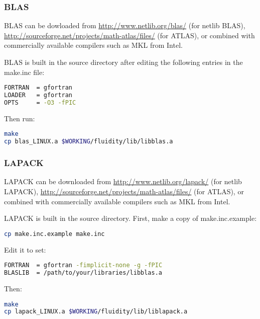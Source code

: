 \subsubsection{BLAS}
\label{sec:required_libraries_numerical_blas}

BLAS can be dowloaded from \url{http://www.netlib.org/blas/} (for netlib BLAS),
\url{http://sourceforge.net/projects/math-atlas/files/} (for ATLAS), or
combined with commercially available compilers such as MKL from Intel.

BLAS is built in the source directory after editing the following entries in
the make.inc file:

\begin{lstlisting}[language=bash]
FORTRAN  = gfortran
LOADER   = gfortran
OPTS     = -O3 -fPIC
\end{lstlisting}

Then run:

\begin{lstlisting}[language=bash]
make
cp blas_LINUX.a $WORKING/fluidity/lib/libblas.a
\end{lstlisting}

\subsubsection{LAPACK}
\label{sec:required_libraries_numerical_lapack}

LAPACK can be downloaded from \url{http://www.netlib.org/lapack/} (for netlib
LAPACK), \url{http://sourceforge.net/projects/math-atlas/files/} (for ATLAS),
or combined with commercially available compilers such as MKL from Intel. 

LAPACK is built in the source directory. First, make a copy of
make.inc.example:

\begin{lstlisting}[language=bash]
cp make.inc.example make.inc
\end{lstlisting}

Edit it to set:

\begin{lstlisting}[language=bash]
FORTRAN  = gfortran -fimplicit-none -g -fPIC
BLASLIB  = /path/to/your/libraries/libblas.a
\end{lstlisting}

Then:

\begin{lstlisting}[language=bash]
make
cp lapack_LINUX.a $WORKING/fluidity/lib/liblapack.a
\end{lstlisting}

